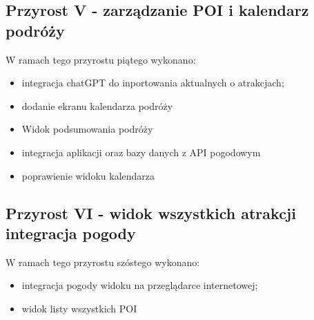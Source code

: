     \subsection{Przyrost V - zarządzanie POI i kalendarz podróży}
    \label{sec:przyrost5}

    W ramach tego przyrostu piątego wykonano:
    \begin{itemize}
        \item integracja chatGPT do inportowania aktualnych o atrakcjach;
        \item dodanie ekranu kalendarza podróży
        \item Widok podsumowania podróży
        \item integracja aplikacji oraz bazy danych z API pogodowym
        \item poprawienie widoku kalendarza
    \end{itemize}

    \subsection{Przyrost VI - widok wszystkich atrakcji integracja pogody}
    \label{sec:przyrost5}

    W ramach tego przyrostu szóstego wykonano:
    \begin{itemize}
        \item integracja pogody widoku na przeglądarce internetowej;
        \item widok listy wszystkich POI
    \end{itemize}

